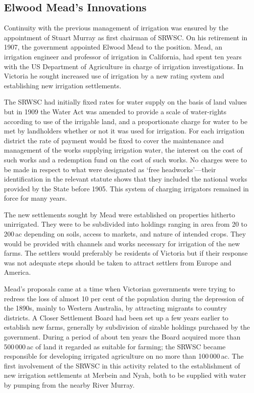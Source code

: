 \subsection*{Elwood Mead's Innovations}

Continuity with the previous management of irrigation was ensured by
the appointment of Stuart Murray as first chairman of SRWSC.  On his
retirement in 1907, the government appointed Elwood Mead to the
position.  Mead, an irrigation engineer and professor of irrigation in
California, had spent ten years with the US Department of Agriculture
in charge of irrigation investigations.  In Victoria he sought
increased use of irrigation by a new rating system and establishing
new irrigation settlements.

The SRWSC had initially fixed rates for water supply on the basis of
land values but in 1909 the Water Act was amended to provide a scale
of water-rights according to use of the irrigable land, and a
proportionate charge for water to be met by landholders whether or not
it was used for irrigation.  For each irrigation district the rate of
payment would be fixed to cover the maintenance and management of the
works supplying irrigation water, the interest on the cost of such
works and a redemption fund on the cost of such works.  No charges
were to be made in respect to what were designated as `free
headworks'---their identification in the relevant statute shows that
they included the national works provided by the State before 1905.
This system of charging irrigators remained in force for many
years.

The new settlements sought by Mead were established on properties
hitherto unirrigated. They were to be subdivided into holdings ranging
in area from 20 to 200\,ac depending on soils, access to markets, and
nature of intended crops.  They would be provided with channels and
works necessary for irrigation of the new farms.  The settlers would
preferably be residents of Victoria but if their response was not
adequate steps should be taken to attract settlers from Europe and
America.

Mead's proposals came at a time when Victorian governments were trying
to redress the loss of almost 10 per cent of the population during the
depression of the 1890s, mainly to Western Australia, by attracting
migrants to country districts.  A Closer Settlement Board had been set
up a few years earlier to establish new farms, generally by
subdivision of sizable holdings purchased by the government.  During a
period of about ten years the Board acquired more than 500\,000\,ac of
land it regarded as suitable for farming; the SRWSC became responsible
for developing irrigated agriculture on no more than 100\,000\,ac.
The first involvement of the SRWSC in this activity related to the
establishment of new irrigation settlements at Merbein and Nyah, both
to be supplied with water by pumping from the nearby River
Murray.

